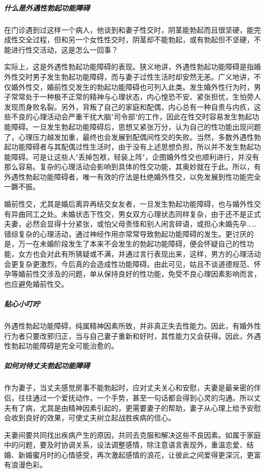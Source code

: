 \subparagraph{什么是外遇性勃起功能障碍}

在门诊遇到过这样一个病人，他谈到和妻子性交时，阴茎能勃起而且很坚硬，能完成性交全过程，但和另一个女性性交时，阴茎却不能勃起，或有勃起但不坚硬，不能进行性交活动，这是怎么一回事？

实际上，这是外遇性勃起功能障碍的表现。狭义地讲，外遇性勃起功能障碍是指婚外性交时男子发生勃起功能障碍，而与妻子过性生活时却安然无恙。广义地讲，不仅婚外性交，婚前性交发生的勃起功能障碍也可列入此类。发生婚外性行为时，男子常常处于一种极不正常的精神与心理状态，内心惶恐不安、紧张担忧，生怕旁人发现而身败名裂。另外，背叛了自己的家庭和配偶，内心总有一种自责与内疚，这些不良的心理活动会严重干扰大脑"司令部"的工作，因此在性交时容易发生勃起功能障碍。一旦发生勃起功能障碍后，思想又紧张万分，认为自己的性功能出现问题了，心理压力越发加重，最终也会发展到配偶间性交的失败。当然，多数外遇性勃起功能障碍者与其配偶过性生活时，由于没有上述思想负担，所以并不发生勃起功能障碍。可是让这些人"丢掉包袱，轻装上阵"，企图婚外性交也顺利进行，并没有那么容易。复杂的心理活动会影响到具体的性交功能，其奥妙就在于此。所以，有外遇性勃起功能障碍者，唯一有效的疗法是杜绝婚外性交，以免发展到性功能完全一蹶不振。

婚前性交，尤其是婚后离异再结交女友者，一旦发生勃起功能障碍，也与婚外性交有异曲同工之处。未婚状态下性交，男女双方心理状态同样复杂，由于还不是正式夫妻，必然会显得十分紧张，或怕父母责怪和别人闲言碎语，或担心未婚先孕……错综复杂的心理活动，通过神经作用亦常常导致勃起功能障碍的发生。更讨厌的是，万一在未婚阶段发生了本来不会发生的勃起功能障碍，便会怀疑自己的性功能，女方也会对此有所猜疑或不满，并通过言行表现出来，这样，男方的心理活动会更复杂更激烈，今后真的会造成性功能障碍。由此可见，姑且不谈道德规范、怀孕等婚前性交涉及的问题，单从保持良好的性功能，免受不良心理因素影响而言，也应避免婚前性交。

\subparagraph{贴心小叮咛}

外遇性勃起功能障碍，纯属精神因素所致，并非真正失去性能力。因此，有婚外性行为者只要改邪归正，当与自己妻子重新和好时，其性能力又会获得。因此，外遇性勃起功能障碍是完全可能治愈的。

\subparagraph{如何对待丈夫勃起功能障碍}

作为妻子，当丈夫感觉房事不能勃起时，应对丈夫关心和安慰，夫妻是最亲密的伴侣，往往通过一个爱抚动作，一个手势，甚至一句话都会得到心灵的沟通。所以丈夫有了病，尤其是由精神因素引起的，更需要妻子的帮助，妻子从心理上给予安慰会收到良好的效果，可使丈夫树立起战胜疾病的信心。

夫妻间要共同找出疾病产生的原因，共同去克服和解决这些不良因素。如属于家庭中的问题，要及时协调关系，设法调整感情，除注意语言表现外，重温恋爱、结婚、新婚蜜月时的心情感受，再次激起感情的浪花，让彼此之间爱得更深沉，更富有浪漫色彩。


